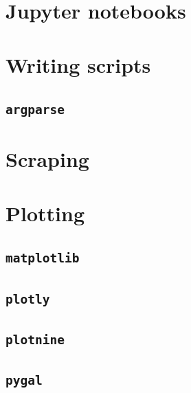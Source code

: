 \documentclass[
]{book}
\begin{document}
\hypertarget{p-jupyter-notebooks}{%
\section{Jupyter notebooks}\label{p-jupyter-notebooks}}

\hypertarget{p-writing-scripts}{%
\section{Writing scripts}\label{p-writing-scripts}}

\hypertarget{p-argparse}{%
\subsection{\texorpdfstring{\texttt{argparse}}{argparse}}\label{p-argparse}}

\hypertarget{p-scraping}{%
\section{Scraping}\label{p-scraping}}

\hypertarget{p-plotting}{%
\section{Plotting}\label{p-plotting}}

\hypertarget{p-matplotlib}{%
\subsection{\texorpdfstring{\texttt{matplotlib}}{matplotlib}}\label{p-matplotlib}}

\hypertarget{p-plotly}{%
\subsection{\texorpdfstring{\texttt{plotly}}{plotly}}\label{p-plotly}}

\hypertarget{p-plotnine}{%
\subsection{\texorpdfstring{\texttt{plotnine}}{plotnine}}\label{p-plotnine}}

\hypertarget{p-pygal}{%
\subsection{\texorpdfstring{\texttt{pygal}}{pygal}}\label{p-pygal}}
\end{document}
